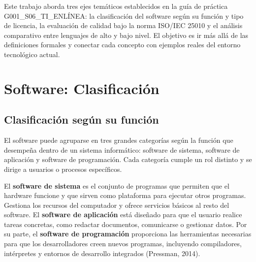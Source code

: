 \documentclass[12pt,a4paper]{article}
\begin{document}
	Este trabajo aborda tres ejes temáticos establecidos en la guía de práctica G001\_S06\_TI\_ENLÍNEA: la clasificación del software según su función y tipo de licencia, la evaluación de calidad bajo la norma ISO/IEC 25010 y el análisis comparativo entre lenguajes de alto y bajo nivel. El objetivo es ir más allá de las definiciones formales y conectar cada concepto con ejemplos reales del entorno tecnológico actual.
	
	\section{Software: Clasificación}
	
	\subsection{Clasificación según su función}
	
	El software puede agruparse en tres grandes categorías según la función que desempeña dentro de un sistema informático: software de sistema, software de aplicación y software de programación. Cada categoría cumple un rol distinto y se dirige a usuarios o procesos específicos.
	
	El \textbf{software de sistema} es el conjunto de programas que permiten que el hardware funcione y que sirven como plataforma para ejecutar otros programas. Gestiona los recursos del computador y ofrece servicios básicos al resto del software. El \textbf{software de aplicación} está diseñado para que el usuario realice tareas concretas, como redactar documentos, comunicarse o gestionar datos. Por su parte, el \textbf{software de programación} proporciona las herramientas necesarias para que los desarrolladores creen nuevos programas, incluyendo compiladores, intérpretes y entornos de desarrollo integrados (Pressman, 2014).
	
\end{document}
